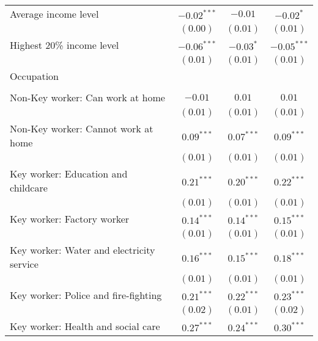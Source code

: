 \begin{table}
\begin{center}
\begin{scriptsize}
\begin{tabular}{l c c c}
\quad Average income level                      & $-0.02^{***}$ & $-0.01$      & $-0.02^{*}$   \\
                                                & $(0.00)$      & $(0.01)$     & $(0.01)$      \\
\quad Highest 20\% income level                 & $-0.06^{***}$ & $-0.03^{*}$  & $-0.05^{***}$ \\
                                                & $(0.01)$      & $(0.01)$     & $(0.01)$      \\
Occupation                                      &               &              &               \\
                                                &               &              &               \\
\quad Non-Key worker: Can work at home          & $-0.01$       & $0.01$       & $0.01$        \\
                                                & $(0.01)$      & $(0.01)$     & $(0.01)$      \\
\quad Non-Key worker: Cannot work at home       & $0.09^{***}$  & $0.07^{***}$ & $0.09^{***}$  \\
                                                & $(0.01)$      & $(0.01)$     & $(0.01)$      \\
\quad Key worker: Education and childcare       & $0.21^{***}$  & $0.20^{***}$ & $0.22^{***}$  \\
                                                & $(0.01)$      & $(0.01)$     & $(0.01)$      \\
\quad Key worker: Factory worker                & $0.14^{***}$  & $0.14^{***}$ & $0.15^{***}$  \\
                                                & $(0.01)$      & $(0.01)$     & $(0.01)$      \\
\quad Key worker: Water and electricity service & $0.16^{***}$  & $0.15^{***}$ & $0.18^{***}$  \\
                                                & $(0.01)$      & $(0.01)$     & $(0.01)$      \\
\quad Key worker: Police and fire-fighting      & $0.21^{***}$  & $0.22^{***}$ & $0.23^{***}$  \\
                                                & $(0.02)$      & $(0.01)$     & $(0.02)$      \\
\quad Key worker: Health and social care        & $0.27^{***}$  & $0.24^{***}$ & $0.30^{***}$  \\

\end{tabular}
\end{scriptsize}
\end{center}
\end{table}
